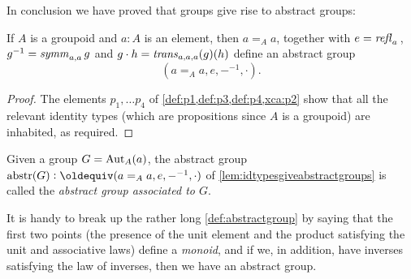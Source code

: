 In conclusion we have proved that groups give rise to abstract groups:
\newcommand{\abstr}{\mathrm{abstr}}
  \begin{lemma}\label{lem:idtypesgiveabstractgroups}
    If $A$ is a groupoid %
and $a:A$ is an element, then $a=_Aa$, together with $e=\mathop{{\it refl}_{a}}{}$, $g^{-1}=\mathop{\mathit{symm}}_{a,a}g$ and $g\cdot h=\mathop{\mathit{trans}}_{a,a,a}(g)(h)$ define an abstract group
$$(a=_Aa,e,{-}^{-1},\cdot).$$
  \end{lemma}
  \begin{proof}
    The elements $p_1,\dots p_4$ of \cref{def:p1,def:p3,def:p4,xca:p2} show that all the relevant identity types (which are propositions since $A$ is a groupoid) are inhabited, as required.
  \end{proof}
  \begin{definition}
    Given a group $G=\mathrm{Aut}_A(a)$, the abstract group $\abstr(G)\defequi (a=_Aa,e,{-}^{-1},\cdot)$ of \cref{lem:idtypesgiveabstractgroups} is called the \emph{abstract group associated to $G$}.
  \end{definition}

  \begin{remark}
    It is handy to break up the rather long \cref{def:abstractgroup}  by saying that the first two points (\ie the presence of the unit element and the product satisfying the unit and associative laws) define a \emph{monoid}, and if we, in addition, have inverses satisfying the law of inverses, then we have an abstract group.
    \end{remark}


